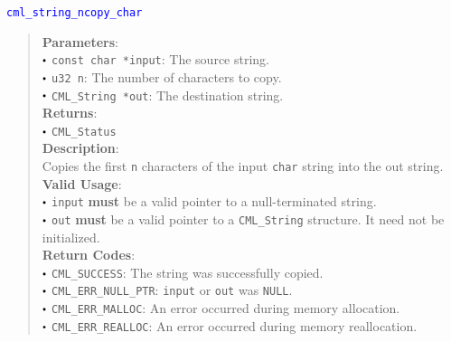 \documentclass[a4paper,oneside,8pt]{extarticle}
\newcommand{\function}[1]{
  \noindent\textcolor{blue}{\texttt{#1}}
  \vspace{-0.3em}
}
\renewcommand{\dot}{\raisebox{0.3ex}{\scalebox{0.6}{$\bullet$}}}
\theoremstyle{definition}
\begin{document}
\function{cml\_string\_ncopy\_char}
\begin{quote}
  \textbf{Parameters}: \\
  $\dot$ \texttt{const char *input}: The source string. \\
  $\dot$ \texttt{u32 n}: The number of characters to copy. \\
  $\dot$ \texttt{CML\_String *out}: The destination string. \\
  \textbf{Returns}: \\
  $\dot$ \texttt{CML\_Status} \\

  \vspace{-0.75em}
  \textbf{Description}: \\
  Copies the first \texttt{n} characters of the input \texttt{char} string into the out string. \\

  \vspace{-0.75em}
  \textbf{Valid Usage}: \\
  $\dot$ \texttt{input} \textbf{must} be a valid pointer to a null-terminated string. \\
  $\dot$ \texttt{out} \textbf{must} be a valid pointer to a \texttt{CML\_String} structure. It need not be initialized. \\

  \vspace{-0.75em}
  \textbf{Return Codes}: \\
  $\dot$ \texttt{CML\_SUCCESS}: The string was successfully copied. \\
  $\dot$ \texttt{CML\_ERR\_NULL\_PTR}: \texttt{input} or \texttt{out} was \texttt{NULL}. \\
  $\dot$ \texttt{CML\_ERR\_MALLOC}: An error occurred during memory allocation. \\
  $\dot$ \texttt{CML\_ERR\_REALLOC}: An error occurred during memory reallocation. \\
\end{quote}
\end{document}
